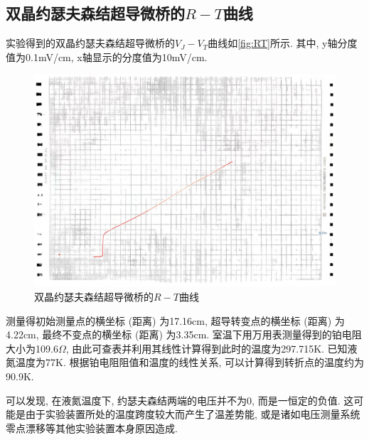 \documentclass[font=default]{mpltx}
\begin{document}
  \subsection{双晶约瑟夫森结超导微桥的$R-T$曲线}
  实验得到的双晶约瑟夫森结超导微桥的$V_J-V_T$曲线如\autoref{fig:RT}所示. 其中, y轴分度值为0.1mV/cm, x轴显示的分度值为10mV/cm.
  \begin{figure}
    \centering
    \includegraphics[width=0.85\linewidth]{fig/3.jpg}
    \caption{双晶约瑟夫森结超导微桥的$R-T$曲线}
    \label{fig:RT}
  \end{figure}

  测量得初始测量点的横坐标 (距离) 为17.16cm, 超导转变点的横坐标 (距离) 为4.22cm, 最终不变点的横坐标 (距离) 为3.35cm.
  室温下用万用表测量得到的铂电阻大小为109.6$\Omega$, 由此可查表并利用其线性计算得到此时的温度为297.715K.
  已知液氮温度为77K. 根据铂电阻阻值和温度的线性关系, 可以计算得到转折点的温度约为90.9K. 

  \par
  可以发现, 在液氮温度下, 约瑟夫森结两端的电压并不为0, 而是一恒定的负值. 这可能是由于实验装置所处的温度跨度较大而产生了温差势能, 或是诸如电压测量系统零点漂移等其他实验装置本身原因造成.
\end{document}
